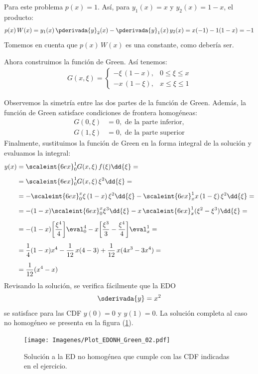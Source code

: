 Para este problema $p (x) = 1$. Así, para $y_{1} (x) = x$ y $y_{2} (x) = 1 - x$, el producto:
\begin{align*}
p (x) \, W (x) =  y_{1} (x) \, \pderivada{y}_{2} (x) - \pderivada{y}_{1} (x) \, y_{2} (x) = x (-1) -  1(1 - x) = - 1
\end{align*}
Tomemos en cuenta que $p (x) \, W (x)$ es una constante, como debería ser.
\par
Ahora construimos la función de Green. Así tenemos:
\begin{align}
G (x, \xi) = \begin{cases}
- \xi \, (1 - x), & 0 \leq \xi \leq x \\
- x \, (1 - \xi), & x \leq \xi \leq 1
\end{cases}
\label{eq:ecuacion_07_35}
\end{align}

Observemos la simetría entre las dos partes de la función de Green. \break \hfill Además, la función de Green satisface condiciones de frontera homogéneas: 
\begin{align*}
G (0, \xi) &= 0, \mbox{ de la parte inferior}, \\[0.5em]
G (1, \xi) &= 0, \mbox{ de la parte superior}
\end{align*}
Finalmente, sustituimos la función de Green en la forma integral de la solución y evaluamos la integral:
\begin{align}
\begin{aligned}[b]
y (x) &= \scaleint{6ex}_{0}^{1} G (x, \xi) \, f (\xi) \dd{\xi} = \\[0.5em]
&= \scaleint{6ex}_{0}^{1} G (x, \xi) \, \xi^{2} \dd{\xi} = \\[0.5em]
&= - \scaleint{6ex}_{0}^{x} \xi \, (1 - x) \, \xi^{2} \dd{\xi} - \scaleint{6ex}_{x}^{1} x \, (1 - \xi) \, \xi^{2} \dd{\xi} = \\[0.5em]
&= - (1 - x) \scaleint{6ex}_{0}^{x} \xi^{3} \dd{\xi} - x \, \scaleint{6ex}_{x}^{1} (\xi^{2} - \xi^{3}) \dd{\xi} = \\[0.5em]
&= - (1 - x) \bigg[ \dfrac{\xi^{4}}{4} \bigg] \eval_{0}^{4} - x \bigg[ \dfrac{\xi^{3}}{3} - \dfrac{\xi^{4}}{4} \bigg] \eval_{x}^{1} = \\[0.5em]
&= \dfrac{1}{4} (1 - x) x^{4} - \dfrac{1}{12} \, x (4 - 3) + \dfrac{1}{12} \, x (4 x^{3} - 3 x^{4}) = \\[0.5em]
&= \dfrac{1}{12} (x^{4} - x)
\end{aligned}
\label{eq:ecuacion_07_36}
\end{align}
Revisando la solución, se verifica fácilmente que la EDO
\begin{align*}
\sderivada{y} = x^{2}
\end{align*}
se satisface para las CDF $y (0) = 0$ y $y (1) = 0$. La solución completa al caso no homogéneo se presenta en la figura (\ref{fig:figura_04}).
\begin{figure}[H]
    \centering
    \texttt{[image: Imagenes/Plot\_EDONH\_Green\_02.pdf]}
    \caption{Solución a la ED no homogénea que cumple con las CDF indicadas en el ejercicio.}
    \label{fig:figura_04}
\end{figure}

